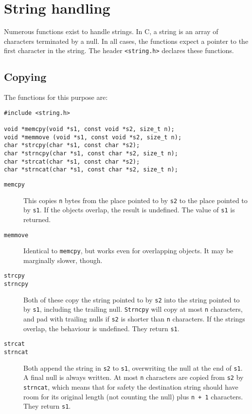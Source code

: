   

 
        \section{String handling}
        

  

  Numerous functions exist to handle strings.  In C, a string is an array of
   characters terminated by a null.  In all cases, the functions expect
   a pointer to the first character in the string.  The header
   \texttt{<string.h>} declares these functions.


  \subsection{Copying}
   

   The functions for this purpose are:


   \begin{Verbatim}
#include <string.h>

void *memcpy(void *s1, const void *s2, size_t n);
void *memmove (void *s1, const void *s2, size_t n);
char *strcpy(char *s1, const char *s2);
char *strncpy(char *s1, const char *s2, size_t n);
char *strcat(char *s1, const char *s2);
char *strncat(char *s1, const char *s2, size_t n);
\end{Verbatim}

   \begin{description}
   \item[\texttt{memcpy}]
     This copies \texttt{n} bytes from the place pointed to  by
     \texttt{s2}  to the  place pointed to by \texttt{s1}.
     If the objects overlap, the result is undefined.
     The value of \texttt{s1} is returned.

   \item[\texttt{memmove}]
     Identical to  \texttt{memcpy},  but  works  even  for  overlapping
     objects.  It may be marginally slower, though.

   \item[\texttt{strcpy}]
   \item[\texttt{strncpy}]
     Both of these copy the string pointed to by \texttt{s2}  into  the
     string  pointed  to  by \texttt{s1}, including the  trailing null.
     \texttt{Strncpy} will copy at most  \texttt{n}  characters,  and
     pad  with trailing  nulls  if  \texttt{s2} is shorter than
     \texttt{n} characters.  If the strings overlap, the behaviour  is
     undefined.   They return \texttt{s1}.
   \item[\texttt{strcat}]
   \item[\texttt{strncat}]
     Both append the string in \texttt{s2} to \texttt{s1},
     overwriting the  null at  the  end  of \texttt{s1}.
     A final null is always written.
     At most \texttt{n} characters are copied from
     \texttt{s2}  by  \texttt{strncat},  which means  that for safety
     the destination string should have room for its original length (not
     counting the null) plus \texttt{n + 1} characters.
     They return \texttt{s1}.
   \end{description}

